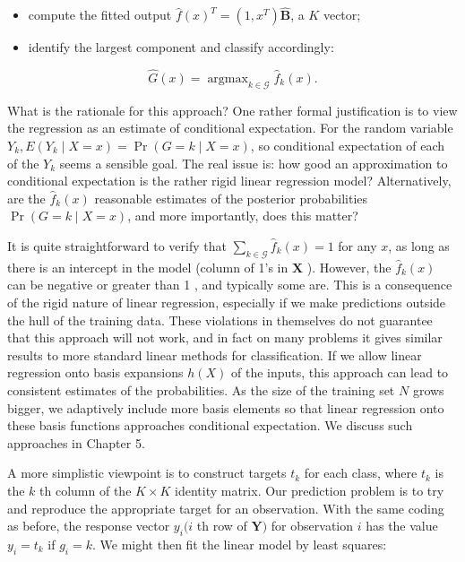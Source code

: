 \documentclass[10pt]{article}
\begin{document}
\begin{itemize}
  \item compute the fitted output $\hat{f}(x)^{T}=\left(1, x^{T}\right) \hat{\mathbf{B}}$, a $K$ vector;
  \item identify the largest component and classify accordingly:
\end{itemize}


\begin{equation*}
\hat{G}(x)=\operatorname{argmax}_{k \in \mathcal{G}} \hat{f}_{k}(x) . \tag{4.4}
\end{equation*}


What is the rationale for this approach? One rather formal justification is to view the regression as an estimate of conditional expectation. For the random variable $Y_{k}, E\left(Y_{k} \mid X=x\right)=\operatorname{Pr}(G=k \mid X=x)$, so conditional expectation of each of the $Y_{k}$ seems a sensible goal. The real issue is: how good an approximation to conditional expectation is the rather rigid linear regression model? Alternatively, are the $\hat{f}_{k}(x)$ reasonable estimates of the posterior probabilities $\operatorname{Pr}(G=k \mid X=x)$, and more importantly, does this matter?

It is quite straightforward to verify that $\sum_{k \in \mathcal{G}} \hat{f}_{k}(x)=1$ for any $x$, as long as there is an intercept in the model (column of 1's in $\mathbf{X}$ ). However, the $\hat{f}_{k}(x)$ can be negative or greater than 1 , and typically some are. This is a consequence of the rigid nature of linear regression, especially if we make predictions outside the hull of the training data. These violations in themselves do not guarantee that this approach will not work, and in fact on many problems it gives similar results to more standard linear methods for classification. If we allow linear regression onto basis expansions $h(X)$ of the inputs, this approach can lead to consistent estimates of the probabilities. As the size of the training set $N$ grows bigger, we adaptively include more basis elements so that linear regression onto these basis functions approaches conditional expectation. We discuss such approaches in Chapter 5.

A more simplistic viewpoint is to construct targets $t_{k}$ for each class, where $t_{k}$ is the $k$ th column of the $K \times K$ identity matrix. Our prediction problem is to try and reproduce the appropriate target for an observation. With the same coding as before, the response vector $y_{i}(i$ th row of $\mathbf{Y})$ for observation $i$ has the value $y_{i}=t_{k}$ if $g_{i}=k$. We might then fit the linear model by least squares:
\end{document}
